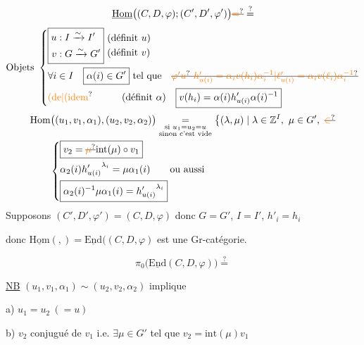 \[
\underline{\mathrm{Hom}}\big((C,D,\varphi);(C',D',\varphi')\big)\deleted{\unsure{=}}\overset{?}{=}
\]
\[
\text{Objets}\ \left\{\begin{aligned}
&\boxed{\begin{aligned}u &:I\xrightarrow{\sim}I'\\v &:G\xrightarrow{\sim}G'\end{aligned}}\ 
  \begin{aligned}&\text{(définit $u$)}\\ &\text{(définit $v$)}\end{aligned}\\
&\forall i\in I \quad \boxed{\alpha(i)\in G'}\ \text{tel que}\quad
\deleted{\unsure{\varphi'u}\ \unsure{h'_{u(i)}=\alpha_i v(h_i)\alpha_i^{-1}|\ell'_{u(i)}=\alpha_i v(\ell_i)\alpha_i^{-1}}}\\
&\text{\unsure{(de|(idem}}\hspace{3em}\text{(définit $\alpha$)}\quad
\boxed{v(h_i)=\alpha(i)h'_{u(i)}\alpha(i)^{-1}}
\end{aligned}\right.
\]
\[
\begin{aligned}
&\mathrm{Hom}\big((u_1,v_1,\alpha_1),(u_2,v_2,\alpha_2)\big)
 \underset{\substack{\text{si }u_1=u_2=u\\\text{sinon c'est vide}}}{=}
 \big\{(\lambda,\mu)\mid\lambda\in\mathbb Z^I,\ \mu\in G',\ \deleted{\unsure{\in}}\\
&\qquad \left\{\begin{aligned}
&\boxed{v_2=\deleted{\unsure{\mu}}\mathrm{int}(\mu)\circ v_1}\\
&\alpha_2(i){h'_{u(i)}}^{\lambda_i}=\mu\alpha_1(i)\qquad \text{ou aussi}\\
&\boxed{\alpha_2(i)^{-1}\mu\alpha_1(i)={h'_{u(i)}}^{\lambda_i}}
\end{aligned}\right.
\end{aligned}
\]
Supposons $(C',D',\varphi')=(C,D,\varphi)$ donc $G=G'$, $I=I'$, $h'_i=h_i$

donc $\underline{\mathrm{Hom}}(,)=\underline{\mathrm{End}}((C,D,\varphi)$ est une Gr-catégorie.

\[
\pi_0\big(\underline{\mathrm{End}}(C,D,\varphi)\big)\overset{?}{=}
\]

\uline{NB} $(u_1,v_1,\alpha_1)\sim(u_2,v_2,\alpha_2)$  implique

a) $u_1=u_2\ (=u)$

b) $v_2$ conjugué de $v_1$ i.e. $\exists\mu\in G'$ tel que $v_2=\mathrm{int}(\mu)v_1$

